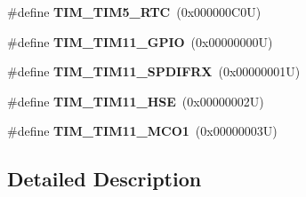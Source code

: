 \begin{DoxyCompactItemize}
\#define {\bfseries T\+I\+M\+\_\+\+T\+I\+M5\+\_\+\+R\+TC}~(0x000000\+C0\+U)
\item 
\mbox{\label{group___t_i_m_ex___remap_gac8a0bac87924350651da1957081bc9ae}} 
\#define {\bfseries T\+I\+M\+\_\+\+T\+I\+M11\+\_\+\+G\+P\+IO}~(0x00000000\+U)
\item 
\mbox{\label{group___t_i_m_ex___remap_ga4c5af0074a427706f65acb3f60c3def3}} 
\#define {\bfseries T\+I\+M\+\_\+\+T\+I\+M11\+\_\+\+S\+P\+D\+I\+F\+RX}~(0x00000001\+U)
\item 
\mbox{\label{group___t_i_m_ex___remap_ga3b08e8165670e3034401099aada7712d}} 
\#define {\bfseries T\+I\+M\+\_\+\+T\+I\+M11\+\_\+\+H\+SE}~(0x00000002\+U)
\item 
\mbox{\label{group___t_i_m_ex___remap_gaaddedea383f0cf24559a7b7be00ecd7e}} 
\#define {\bfseries T\+I\+M\+\_\+\+T\+I\+M11\+\_\+\+M\+C\+O1}~(0x00000003\+U)
\end{DoxyCompactItemize}


\subsection{Detailed Description}
